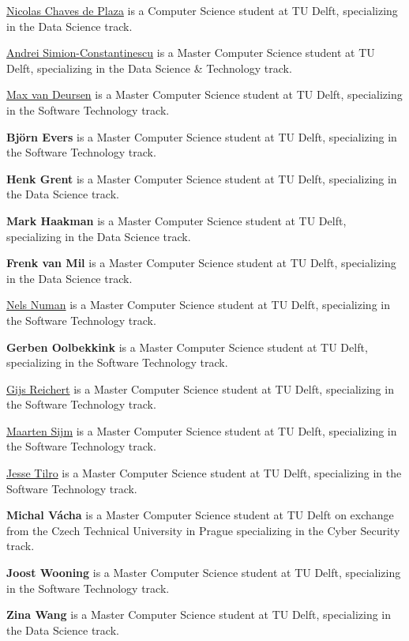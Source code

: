\documentclass[]{book}
\begin{document}
\href{https://www.linkedin.com/in/nicolaschavesdeplaza/}{Nicolas Chaves
de Plaza} is a Computer Science student at TU Delft, specializing in the
Data Science track.

\href{https://www.linkedin.com/in/andrei-simion-constantinescu/}{Andrei
Simion-Constantinescu} is a Master Computer Science student at TU Delft,
specializing in the Data Science \& Technology track.

\href{http://maxvandeursen.nl}{Max van Deursen} is a Master Computer
Science student at TU Delft, specializing in the Software Technology
track.

\textbf{Björn Evers} is a Master Computer Science student at TU Delft,
specializing in the Software Technology track.

\textbf{Henk Grent} is a Master Computer Science student at TU Delft,
specializing in the Data Science track.

\textbf{Mark Haakman} is a Master Computer Science student at TU Delft,
specializing in the Data Science track.

\textbf{Frenk van Mil} is a Master Computer Science student at TU Delft,
specializing in the Data Science track.

\href{https://www.linkedin.com/in/nsalminen/}{Nels Numan} is a Master
Computer Science student at TU Delft, specializing in the Software
Technology track.

\textbf{Gerben Oolbekkink} is a Master Computer Science student at TU
Delft, specializing in the Software Technology track.

\href{https://www.linkedin.com/in/gijs-reichert/}{Gijs Reichert} is a
Master Computer Science student at TU Delft, specializing in the
Software Technology track.

\href{https://www.linkedin.com/in/mpsijm/}{Maarten Sijm} is a Master
Computer Science student at TU Delft, specializing in the Software
Technology track.

\href{https://www.linkedin.com/in/jesse-tilro/}{Jesse Tilro} is a Master
Computer Science student at TU Delft, specializing in the Software
Technology track.

\textbf{Michal Vácha} is a Master Computer Science student at TU Delft
on exchange from the Czech Technical University in Prague specializing
in the Cyber Security track.

\textbf{Joost Wooning} is a Master Computer Science student at TU Delft,
specializing in the Software Technology track.

\textbf{Zina Wang} is a Master Computer Science student at TU Delft,
specializing in the Data Science track.
\end{document}
